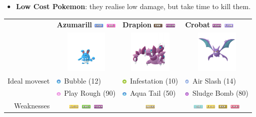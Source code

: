 \documentclass[12pt]{beamer}
\newcommand{\darkfull}{\includegraphics[height=0.2cm]{../../images/type/full/Dark.png}}
\newcommand{\electricfull}{\includegraphics[height=0.2cm]{../../images/type/full/Electric.png}}
\newcommand{\fairyfull}{\includegraphics[height=0.2cm]{../../images/type/full/Fairy.png}}
\newcommand{\flyingfull}{\includegraphics[height=0.2cm]{../../images/type/full/Flying.png}}
\newcommand{\grassfull}{\includegraphics[height=0.2cm]{../../images/type/full/Grass.png}}
\newcommand{\groundfull}{\includegraphics[height=0.2cm]{../../images/type/full/Ground.png}}
\newcommand{\icefull}{\includegraphics[height=0.2cm]{../../images/type/full/Ice.png}}
\newcommand{\psychicfull}{\includegraphics[height=0.2cm]{../../images/type/full/Psychic.png}}
\newcommand{\rockfull}{\includegraphics[height=0.2cm]{../../images/type/full/Rock.png}}
\newcommand{\waterfull}{\includegraphics[height=0.2cm]{../../images/type/full/Water.png}}
\newcommand{\poisonfull}{\includegraphics[height=0.2cm]{../../images/type/full/Poison.png}}
\newcommand{\watersimp}{\includegraphics[height=0.2cm]{../../images/type/simplified/water.png}}
\newcommand{\fairysimp}{\includegraphics[height=0.2cm]{../../images/type/simplified/fairy.png}}
\newcommand{\flyingsimp}{\includegraphics[height=0.2cm]{../../images/type/simplified/flying.png}}
\newcommand{\poisonsimp}{\includegraphics[height=0.2cm]{../../images/type/simplified/poison.png}}
\newcommand{\bugsimp}{\includegraphics[height=0.2cm]{../../images/type/simplified/bug.png}}
\begin{document}
\begin{frame}
\begin{block}{}
\begin{footnotesize}
\begin{itemize}
  \item \textbf{Low Cost Pokemon}: they realise low damage, but take time to kill them.
\end{itemize}

\begin{center}
\begin{tabular}{rp{3.2cm}p{3.2cm}p{3.2cm}}
& \textbf{Azumarill} \hfill\waterfull~\fairyfull & \textbf{Drapion} \hfill \darkfull~\poisonfull & \textbf{Crobat} \hfill \poisonfull~\flyingfull  \\
& \multicolumn{1}{c}{\includegraphics[width=2cm]{../../images/pokemon/Azumarill}} &
\multicolumn{1}{c}{\includegraphics[width=2cm]{../../images/pokemon/Drapion}} &
\multicolumn{1}{c}{\includegraphics[width=2cm]{../../images/pokemon/Crobat}}  \\ \hline
Ideal moveset &  \watersimp~Bubble (12)& \bugsimp~Infestation (10) & \flyingsimp~Air Slash (14)  \\
&  \fairysimp~Play Rough (90) &  \watersimp~Aqua Tail (50) & \poisonsimp~Sludge Bomb (80)  \\ \hline
Weaknesses  & \multicolumn{1}{c}{\electricfull~\grassfull~\poisonfull}  &  \multicolumn{1}{c}{\groundfull} & \multicolumn{1}{c}{\icefull~\electricfull~\rockfull~\psychicfull} \\
\end{tabular}
\end{center}



\end{footnotesize}
\end{block}
\end{frame}
\end{document}
